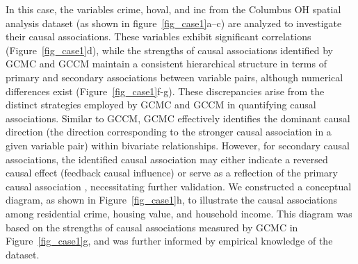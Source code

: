 \documentclass[authoryear,preprint,review,12pt]{elsarticle}
\begin{document}
In this case, the variables crime, hoval, and inc from the Columbus OH spatial analysis dataset (as shown in figure~\ref{fig_case1}a–c) are analyzed to investigate their causal associations. These variables exhibit significant correlations (Figure~\ref{fig_case1}d), while the strengths of causal associations identified by GCMC and GCCM maintain a consistent hierarchical structure in terms of primary and secondary associations between variable pairs, although numerical differences exist (Figure~\ref{fig_case1}f-g). These discrepancies arise from the distinct strategies employed by GCMC and GCCM in quantifying causal associations. Similar to GCCM, GCMC effectively identifies the dominant causal direction (the direction corresponding to the stronger causal association in a given variable pair) within bivariate relationships. However, for secondary causal associations, the identified causal association may either indicate a reversed causal effect (feedback causal influence) or serve as a reflection of the primary causal association \citep{sugihara2012ccm,gao2023gccm}, necessitating further validation. We constructed a conceptual diagram, as shown in Figure~\ref{fig_case1}h, to illustrate the causal associations among residential crime, housing value, and household income. This diagram was based on the strengths of causal associations measured by GCMC in Figure~\ref{fig_case1}g, and was further informed by empirical knowledge of the dataset.
\end{document}
